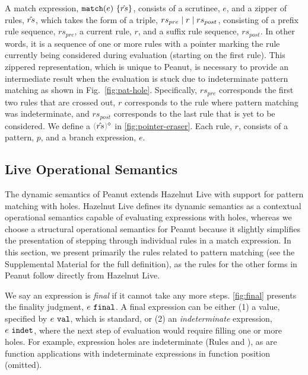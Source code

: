 A match expression, $\mathtt{match}(e)~\{\hat{rs}\}$, 
consists of a scrutinee, $e$, and a zipper of rules, $\hat{rs}$, which takes the form of a triple, $rs_{pre} \mid r \mid rs_{post}$, consisting of a prefix rule sequence, $rs_{pre}$, a current rule, $r$, and a suffix rule sequence, $rs_{post}$. In other words, it is a sequence of one or more rules with a pointer marking the rule currently being considered during evaluation (starting on the first rule). This zippered representation, which is unique to Peanut, is necessary to provide an intermediate result when the evaluation is stuck due to indeterminate pattern matching as shown in Fig.~\ref{fig:pat-hole}. Specifically, $rs_{pre}$ corresponds the first two rules that are crossed out, $r$ corresponds to the rule where pattern matching was indeterminate, and $rs_{post}$ corresponds to the last rule that is yet to be considered. We define a  $\rmpointer{\zrules}$ in \autoref{fig:pointer-eraser}. 
Each rule, $r$, consists of a pattern, $p$, and a branch expression, $e$.

\subsection{Live Operational Semantics}\label{sec:dynamics}


The dynamic semantics of Peanut extends Hazelnut Live \cite{DBLP:journals/pacmpl/OmarVCH19} with support for pattern matching with holes. Hazelnut Live defines its dynamic semantics as a contextual operational  semantics \cite{DBLP:conf/ppdp/PientkaD08} capable of evaluating expressions with holes, whereas we choose a structural operational semantics \cite{DBLP:journals/jlp/Plotkin04a} for Peanut because it slightly simplifies the presentation of stepping through individual rules in a match expression. In this section, we present primarily the rules related to pattern matching (see the Supplemental Material for the full definition), as the rules for the other forms in Peanut follow directly from Hazelnut Live. 




We say an expression is \textit{final} if it cannot take any more steps. \autoref{fig:final} presents the finality judgment, $e ~\mathtt{final}$. A final expression can be either (1) a value, specified by $e ~\mathtt{val}$, which is standard, or (2) an  \emph{indeterminate} expression, $e ~\mathtt{indet}$, where the next step of evaluation would require filling one or more holes. For example, expression holes are indeterminate (Rules \IEHole and \IHole), as are function applications with indeterminate expressions in function position (omitted). 



